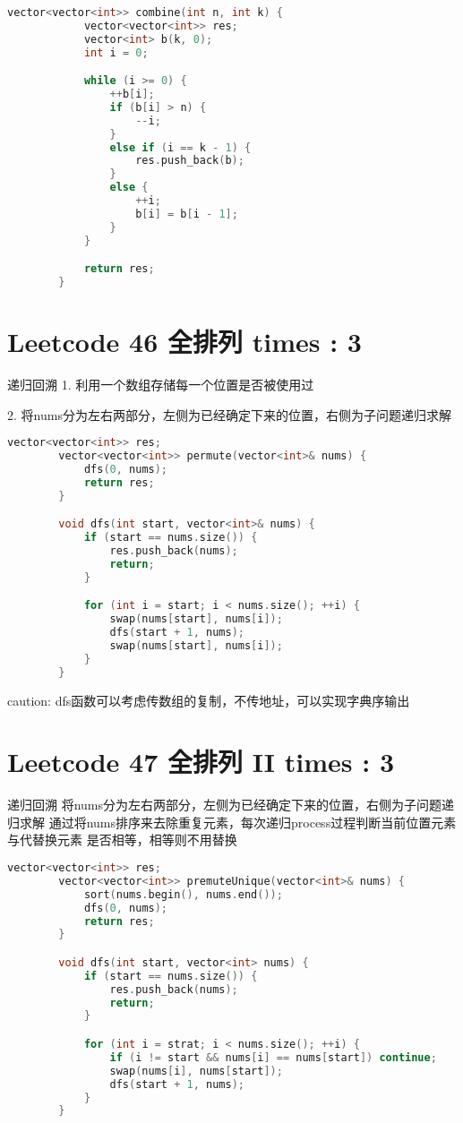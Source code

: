 \documentclass[UTF8]{ctexart}
\begin{document}
\begin{framed}
	\begin{lstlisting}[language=C++]
		vector<vector<int>> combine(int n, int k) {
			vector<vector<int>> res;
			vector<int> b(k, 0);
			int i = 0;

			while (i >= 0) {
				++b[i];
				if (b[i] > n) {
					--i;
				}
				else if (i == k - 1) {
					res.push_back(b);
				}
				else {
					++i;
					b[i] = b[i - 1];
				}
			}

			return res;
		}
	\end{lstlisting}
\end{framed}

\section{Leetcode 46 全排列 times : 3}
递归回溯
1. 利用一个数组存储每一个位置是否被使用过

2. 将nums分为左右两部分，左侧为已经确定下来的位置，右侧为子问题递归求解
\begin{framed}
	\begin{lstlisting}[language=C++]
		vector<vector<int>> res;
		vector<vector<int>> permute(vector<int>& nums) {
			dfs(0, nums);
			return res;
		}

		void dfs(int start, vector<int>& nums) {
			if (start == nums.size()) {
				res.push_back(nums);
				return;
			}

			for (int i = start; i < nums.size(); ++i) {
				swap(nums[start], nums[i]);
				dfs(start + 1, nums);
				swap(nums[start], nums[i]);
			}
		}
	\end{lstlisting}
\end{framed}

caution: dfs函数可以考虑传数组的复制，不传地址，可以实现字典序输出

\section{Leetcode 47 全排列 II times : 3}
递归回溯
将nums分为左右两部分，左侧为已经确定下来的位置，右侧为子问题递归求解
通过将nums排序来去除重复元素，每次递归process过程判断当前位置元素与代替换元素
是否相等，相等则不用替换
\begin{framed}
	\begin{lstlisting}[language=C++]
		vector<vector<int>> res;
		vector<vector<int>> premuteUnique(vector<int>& nums) {
			sort(nums.begin(), nums.end());
			dfs(0, nums);
			return res;
		}

		void dfs(int start, vector<int> nums) {
			if (start == nums.size()) {
				res.push_back(nums);
				return;
			}

			for (int i = strat; i < nums.size(); ++i) {
				if (i != start && nums[i] == nums[start]) continue;
				swap(nums[i], nums[start]);
				dfs(start + 1, nums);
			}
		}
	\end{lstlisting}
\end{framed}
\end{document}
